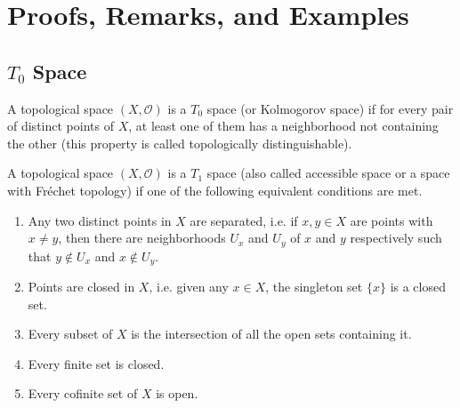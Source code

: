 \section{Proofs, Remarks, and Examples}
\subsection{\(T_0\) Space}
\begin{defbox}
    \begin{definition}
        A {\color{mathobj}topological space} \((X, \mathcal{O})\) is a \(T_0\) space (or Kolmogorov space) if for every pair of distinct points of \(X\), at least one of them has a neighborhood not containing the other (this property is called {\color{mathrem}topologically distinguishable}).
    \end{definition}
\end{defbox}



\begin{defbox}
    \begin{definition}
        A {\color{mathobj}topological space} \((X, \mathcal{O})\) is a {\color{maththen}\(T_1\) space} (also called {\color{maththen}accessible space} or a space with {\color{maththen}Fr\'echet topology}) if one of the following {\color{mathrem}equivalent} conditions are met.
        \begin{enumerate}
            \item Any two distinct points in \(X\) are separated, i.e. if \(x, y \in X\) are points with \(x \neq y\), then there are neighborhoods \(U_x\) and \(U_y\) of \(x\) and \(y\) respectively such that \(y \not\in U_x\) and \(x \not\in U_y\).
            \item Points are closed in \(X\), i.e. given any \(x \in X\), the singleton set \(\{x\}\) is a closed set.
            \item Every subset of \(X\) is the intersection of all the open sets containing it.
            \item Every finite set is closed.
            \item Every cofinite set of \(X\) is open.
        \end{enumerate}
    \end{definition}
\end{defbox}

